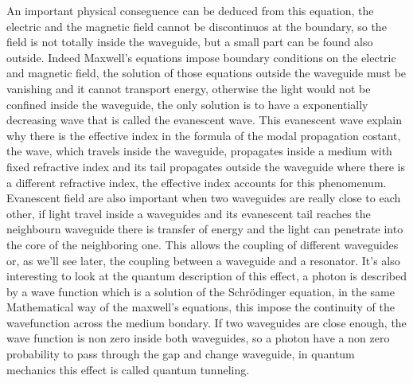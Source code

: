 An important physical conseguence can be deduced from this equation, the electric and the magnetic field cannot be discontinuos at the boundary, so the field is not totally inside the waveguide, but a small part can be found also outside. Indeed Maxwell's equations impose boundary conditions on the electric and magnetic field, the solution of those equations outside the waveguide must be vanishing and it cannot transport energy, otherwise the light would not be confined inside the waveguide, the only solution is to have a exponentially decreasing wave that is called the evanescent wave. This evanescent wave explain why there is the effective index in the formula of the modal propagation costant, the wave, which travels inside the waveguide, propagates inside a medium with fixed refractive index and its tail propagates outside the waveguide where there is a different refractive index, the effective index accounts for this phenomenum.
Evanescent field are also important when two waveguides are really close to each other, if light travel inside a waveguides and its evanescent tail reaches the neighbourn waveguide there is transfer of energy and the light can penetrate into the core of the neighboring one. This allows the coupling of different waveguides or, as we'll see later, the coupling between a waveguide and a resonator. It's also interesting to look at the quantum description of this effect, a photon is described by a wave function which is a solution of the Schr{\"o}dinger equation, in the same Mathematical way of the maxwell's equations, this impose the continuity of the wavefunction across the medium bondary. If two waveguides are close enough, the wave function is non zero inside both waveguides, so a photon have a non zero probability to pass through the gap and change waveguide, in quantum mechanics this effect is called quantum tunneling. 
